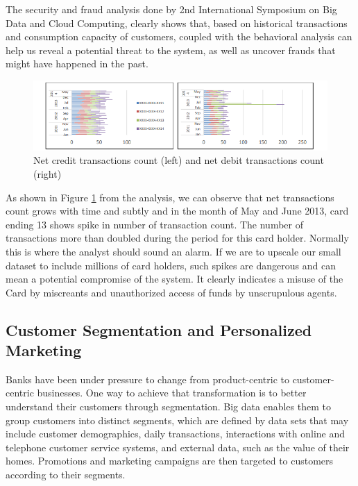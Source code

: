 \documentclass[sigconf]{acmart}
\begin{document}
The security and fraud analysis done by 2nd International Symposium on Big Data and Cloud Computing, clearly shows that, based on historical transactions and consumption capacity of customers, coupled with the behavioral analysis can help us reveal a potential threat to the system, as well as uncover frauds that might have happened in the past\cite{bigdata-banking}. 

\begin{figure}[htb]
  \centering
  \includegraphics[width=1.0\textwidth]{images/Figure3.png}
  \caption{Net credit transactions count (left) and net debit transactions count (right) 
  \cite{bigdata-banking}}
  \label{fig:Figure3} 
\end{figure}

As shown in Figure \ref{fig:Figure3} from the analysis, we can observe that net transactions count grows with time and subtly and in the month of May and June 2013, card ending 13 shows spike in number of transaction count. The number of transactions more than doubled during the period for this card holder. Normally this is where the analyst should sound an alarm. If we are to upscale our small dataset to include millions of card holders, such spikes are dangerous and can mean a potential compromise of the system. It clearly indicates a misuse of the Card by miscreants and unauthorized access of funds by unscrupulous agents.



\subsection{Customer Segmentation and Personalized Marketing}

Banks have been under pressure to change from product-centric to customer-centric businesses. One way to achieve that transformation is to better understand their customers through segmentation. Big data enables them to group customers into distinct segments, which are defined by data sets that may include customer demographics, daily transactions, interactions with online and telephone customer service systems, and external data, such as the value of their homes. Promotions and marketing campaigns are then targeted to customers according to their segments\cite{5-big-data-use-cases-in-banking-and-financial-services}.
\end{document}
